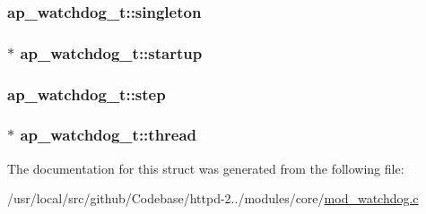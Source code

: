 \subsubsection[{\texorpdfstring{singleton}{singleton}}]{ ap\+\_\+watchdog\+\_\+t\+::singleton}\hypertarget{structap__watchdog__t_a3657a9720443f5c3a6e47f8e2ca6de79}{}\label{structap__watchdog__t_a3657a9720443f5c3a6e47f8e2ca6de79}
\subsubsection[{\texorpdfstring{startup}{startup}}]{$\ast$ ap\+\_\+watchdog\+\_\+t\+::startup}\hypertarget{structap__watchdog__t_ae1d614a9ca65ae3e55f060c25fa37199}{}\label{structap__watchdog__t_ae1d614a9ca65ae3e55f060c25fa37199}
\subsubsection[{\texorpdfstring{step}{step}}]{ ap\+\_\+watchdog\+\_\+t\+::step}\hypertarget{structap__watchdog__t_ae26c9c027d481bbe941943328e620c9c}{}\label{structap__watchdog__t_ae26c9c027d481bbe941943328e620c9c}
\subsubsection[{\texorpdfstring{thread}{thread}}]{$\ast$ ap\+\_\+watchdog\+\_\+t\+::thread}\hypertarget{structap__watchdog__t_a6bd7a4eef4d694a97b595051ed02e1d8}{}\label{structap__watchdog__t_a6bd7a4eef4d694a97b595051ed02e1d8}


The documentation for this struct was generated from the following file\+:\begin{DoxyCompactItemize}
\item 
/usr/local/src/github/\+Codebase/httpd-\/2../modules/core/\hyperlink{mod__watchdog_8c}{mod\+\_\+watchdog.\+c}\end{DoxyCompactItemize}
